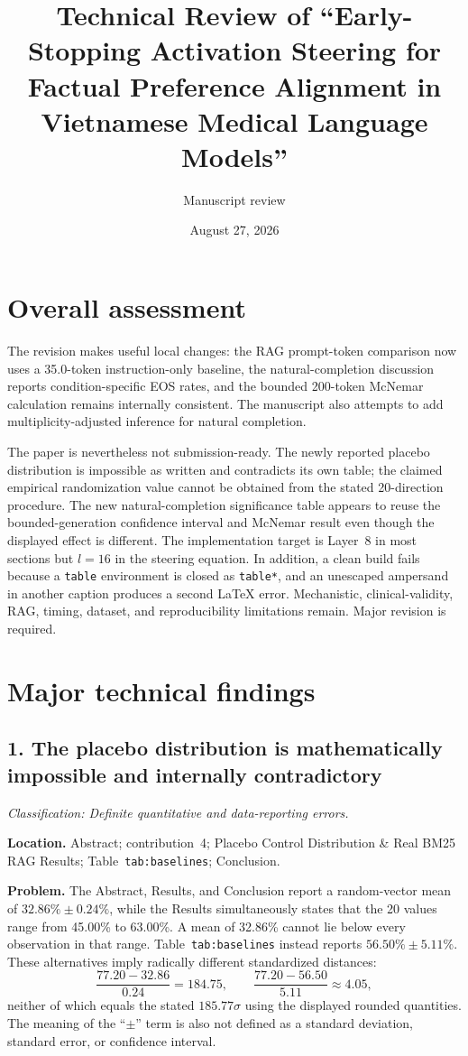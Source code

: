 \documentclass[11pt]{article}
\title{Technical Review of ``Early-Stopping Activation Steering for Factual Preference Alignment in Vietnamese Medical Language Models''}
\author{Manuscript review}
\date{August 27, 2026}
\newcommand{\findinglabel}[1]{\textbf{#1}}
\newcommand{\classification}[1]{\textit{Classification: #1.}}
\begin{document}
\maketitle

\section*{Overall assessment}

The revision makes useful local changes: the RAG prompt-token comparison now uses a 35.0-token instruction-only baseline, the natural-completion discussion reports condition-specific EOS rates, and the bounded 200-token McNemar calculation remains internally consistent.  The manuscript also attempts to add multiplicity-adjusted inference for natural completion.

The paper is nevertheless not submission-ready.  The newly reported placebo distribution is impossible as written and contradicts its own table; the claimed empirical randomization value cannot be obtained from the stated 20-direction procedure.  The new natural-completion significance table appears to reuse the bounded-generation confidence interval and McNemar result even though the displayed effect is different.  The implementation target is Layer~8 in most sections but $l=16$ in the steering equation.  In addition, a clean build fails because a \texttt{table} environment is closed as \texttt{table*}, and an unescaped ampersand in another caption produces a second LaTeX error.  Mechanistic, clinical-validity, RAG, timing, dataset, and reproducibility limitations remain.  Major revision is required.

\section*{Major technical findings}

\subsection*{1. The placebo distribution is mathematically impossible and internally contradictory}

\classification{Definite quantitative and data-reporting errors}

\findinglabel{Location.} Abstract; contribution~4; Placebo Control Distribution \& Real BM25 RAG Results; Table~\texttt{tab:baselines}; Conclusion.

\findinglabel{Problem.} The Abstract, Results, and Conclusion report a random-vector mean of $32.86\%\pm0.24\%$, while the Results simultaneously states that the 20 values range from 45.00\% to 63.00\%.  A mean of 32.86\% cannot lie below every observation in that range.  Table~\texttt{tab:baselines} instead reports $56.50\%\pm5.11\%$.  These alternatives imply radically different standardized distances:
\[
\frac{77.20-32.86}{0.24}=184.75,
\qquad
\frac{77.20-56.50}{5.11}\approx4.05,
\]
neither of which equals the stated $185.77\sigma$ using the displayed rounded quantities.  The meaning of the ``$\pm$'' term is also not defined as a standard deviation, standard error, or confidence interval.
\end{document}
